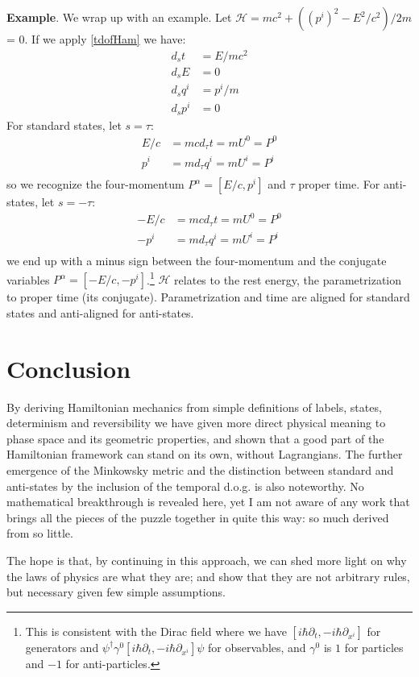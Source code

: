 \documentclass[twocolumn,floatfix,nofootinbib]{revtex4}   %
\theoremstyle{theorem}
\theoremstyle{definition}
\begin{document}
\textbf{Example}. We wrap up with an example. Let $\mathcal{H} = mc^2 + ((p^i)^2 - E^2/c^2) / 2m$ = 0.  If we apply \ref{tdofHam} we have:
\begin{align*}
d_{s}t &= E / mc^2 \\
d_{s}E &= 0 \\
d_{s}q^i &= p^i / m \\
d_{s}p^i &= 0
\end{align*}
For standard states, let $s=\tau$:
\begin{align*}
E / c &= m c d_{\tau}t = m U^0 = P^0 \\
p^i &= m d_{\tau}q^i = m U^i = P^i \\
\end{align*}
so we recognize the four-momentum $P^\alpha = [E/c, p^i]$ and $\tau$ proper time. For anti-states, let $s=-\tau$:
\begin{align*}
- E / c &= m c d_{\tau}t = m U^0 = P^0 \\
- p^i &= m d_{\tau}q^i = m U^i = P^i \\
\end{align*}
we end up with a minus sign between the four-momentum and the conjugate variables $P^\alpha = [-E/c, -p^i]$.\footnote{This is consistent with the Dirac field where we have $[i\hbar\partial_t, -i\hbar\partial_{x^i}]$ for generators and $\psi^\dagger\gamma^0[i\hbar\partial_t, -i\hbar\partial_{x^i}]\psi$ for observables, and $\gamma^0$ is $1$ for particles and $-1$ for anti-particles.} $\mathcal{H}$ relates to the rest energy, the parametrization to proper time (its conjugate). Parametrization and time are aligned for standard states and anti-aligned for anti-states.

\section{Conclusion}
By deriving Hamiltonian mechanics from simple definitions of labels, states, determinism and reversibility we have given more direct physical meaning to phase space and its geometric properties, and shown that a good part of the Hamiltonian framework can stand on its own, without Lagrangians. The further emergence of the Minkowsky metric and the distinction between standard and anti-states by the inclusion of the temporal d.o.g. is also noteworthy. No mathematical breakthrough is revealed here, yet I am not aware of any work that brings all the pieces of the puzzle together in quite this way: so much derived from so little.

The hope is that, by continuing in this approach, we can shed more light on why the laws of physics are what they are; and show that they are not arbitrary rules, but necessary given few simple assumptions.
\end{document}
